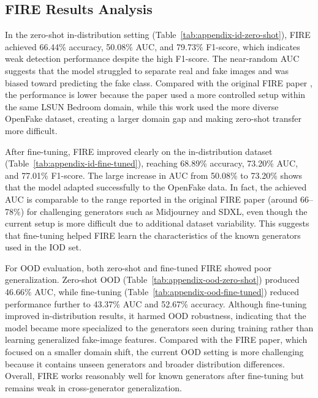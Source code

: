 \subsection{FIRE Results Analysis}
In the zero-shot in-distribution setting (Table~\ref{tab:appendix-id-zero-shot}), FIRE achieved 66.44\% accuracy, 50.08\% AUC, and 79.73\% F1-score, which indicates weak detection performance despite the high F1-score. The near-random AUC suggests that the model struggled to separate real and fake images and was biased toward predicting the fake class. Compared with the original FIRE paper \cite{chen2025fire}, the performance is lower because the paper used a more controlled setup within the same LSUN Bedroom domain, while this work used the more diverse OpenFake dataset, creating a larger domain gap and making zero-shot transfer more difficult.

After fine-tuning, FIRE improved clearly on the in-distribution dataset (Table~\ref{tab:appendix-id-fine-tuned}), reaching 68.89\% accuracy, 73.20\% AUC, and 77.01\% F1-score. The large increase in AUC from 50.08\% to 73.20\% shows that the model adapted successfully to the OpenFake data. In fact, the achieved AUC is comparable to the range reported in the original FIRE paper \cite{chen2025fire} (around 66–78\%) for challenging generators such as Midjourney and SDXL, even though the current setup is more difficult due to additional dataset variability. This suggests that fine-tuning helped FIRE learn the characteristics of the known generators used in the IOD set.

For OOD evaluation, both zero-shot and fine-tuned FIRE showed poor generalization. Zero-shot OOD (Table~\ref{tab:appendix-ood-zero-shot}) produced 46.66\% AUC, while fine-tuning (Table~\ref{tab:appendix-ood-fine-tuned}) reduced performance further to 43.37\% AUC and 52.67\% accuracy. Although fine-tuning improved in-distribution results, it harmed OOD robustness, indicating that the model became more specialized to the generators seen during training rather than learning generalized fake-image features. Compared with the FIRE paper\cite{chen2025fire}, which focused on a smaller domain shift, the current OOD setting is more challenging because it contains unseen generators and broader distribution differences. Overall, FIRE works reasonably well for known generators after fine-tuning but remains weak in cross-generator generalization.